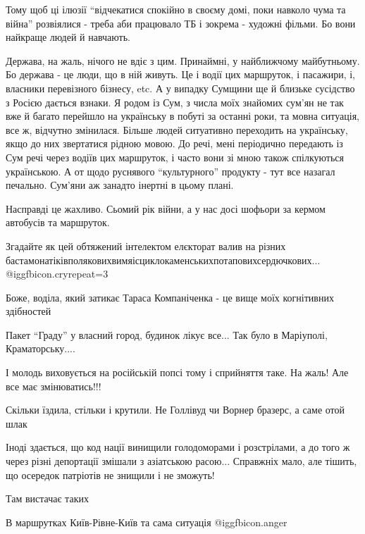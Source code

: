 \begin{itemize}
Тому щоб ці ілюзії \enquote{відчекатися спокійно в своєму домі, поки навколо чума та
війна} розвіялися - треба аби працювало ТБ і зокрема - художні фільми. Бо вони
найкраще людей й навчають.


Держава, на жаль, нічого не вдіє з цим. Принаймні, у найближчому майбутньому.
Бо держава - це люди, що в ній живуть. Це і водії цих маршруток, і пасажири, і,
власники перевізного бізнесу, etc. А у випадку Сумщини ще й близьке сусідство з
Росією дається взнаки. Я родом із Сум, з числа моїх знайомих сум'ян не так вже
й багато перейшло на українську в побуті за останні роки, та мовна ситуація,
все ж, відчутно змінилася. Більше людей ситуативно переходить на українську,
якщо до них звертатися рідною мовою. До речі, мені періодично передають із Сум
речі через водіїв цих маршруток, і часто вони зі мною також спілкуються
українською. А от щодо руснявого \enquote{культурного} продукту - тут все назагал
печально. Сум'яни аж занадто інертні в цьому плані.

Насправді це жахливо. Сьомий рік війни, а у нас досі шофьори за кермом автобусів та маршруток.


Згадайте як цей обтяжений інтелектом елєкторат валив на різних
бастамонатіківполяковихвимяісциклокаменськихпотаповихсердючкових... @igg{fbicon.cry}{repeat=3} 

Боже, воділа, який затикає Тараса Компаніченка - це вище моїх когнітивних здібностей

Пакет \enquote{Граду} у власний город, будинок лікує все...
Так було в Маріуполі, Краматорську....

І молодь виховується на російській попсі тому і сприйняття таке. На жаль! Але все має змінюватись!!!

Скільки їздила, стільки і крутили. Не Голлівуд чи Ворнер бразерс, а саме отой шлак


Іноді здається, що код нації винищили голодоморами і розстрілами, а до того ж
через різні депортації змішали з азіатською расою... Справжніх мало, але
тішить, що осередок патріотів не знищили і не зможуть!


Там вистачає таких

В маршрутках Київ-Рівне-Київ та сама ситуація  @igg{fbicon.anger} 


\end{itemize}
